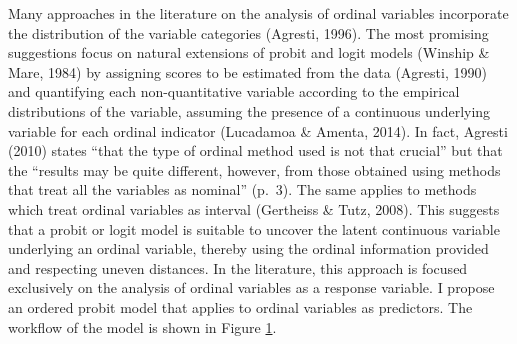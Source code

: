 \documentclass[12pt,econ]{sources/authesis}
\makeatletter
\def\caption{\refstepcounter\@captype \@dblarg{\@caption\@captype}}
\makeatother
\begin{document}
Many approaches in the literature on the analysis of ordinal variables incorporate the distribution of the variable categories (Agresti, 1996). The most promising suggestions focus on natural extensions of probit and logit models (Winship \& Mare, 1984) by assigning scores to be estimated from the data (Agresti, 1990) and quantifying each non-quantitative variable according to the empirical distributions of the variable, assuming the presence of a continuous underlying variable for each ordinal indicator (Lucadamoa \& Amenta, 2014). In fact, Agresti (2010) states ``that the type of ordinal method used is not that crucial'' but that the ``results may be quite different, however, from those obtained using methods that treat all the variables as nominal'' (p.~3). The same applies to methods which treat ordinal variables as interval (Gertheiss \& Tutz, 2008). This suggests that a probit or logit model is suitable to uncover the latent continuous variable underlying an ordinal variable, thereby using the ordinal information provided and respecting uneven distances. In the literature, this approach is focused exclusively on the analysis of ordinal variables as a response variable. I propose an ordered probit model that applies to ordinal variables as predictors. The workflow of the model is shown in Figure \ref{op-workflow}.

\vspace{0.2cm}

\ssp
\begin{figure}
\centering
{}
\caption{Ordered Probit Workflow} 
\label{op-workflow}
\end{figure}
\dsp
\end{document}

